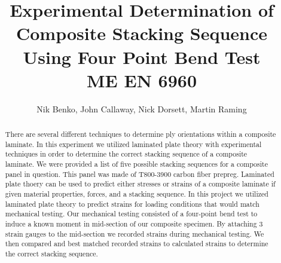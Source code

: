 \documentclass[12pt]{article}
\begin{document}
\title{ Experimental Determination of Composite Stacking Sequence Using Four Point Bend Test\\ \normalsize{ME EN 6960}}
\author{Nik Benko, John Callaway, Nick Dorsett, Martin Raming}
\maketitle
\begin{abstract} %
	There are several different techniques to determine ply orientations within a composite laminate. In this experiment we utilized laminated plate theory with experimental techniques in order to determine the correct stacking sequence of a composite laminate.   We were provided a list of five possible stacking sequences for a composite panel in question. This panel was made of T800-3900 carbon fiber prepreg. Laminated plate thoery can be used to predict either stresses or strains of a composite laminate if given material properties, forces, and a stacking sequence. In this project we utilized laminated plate theory to predict strains for loading conditions that would match mechanical testing.  Our mechanical testing consisted of a four-point bend test to induce a known moment in mid-section of our composite specimen. By attaching 3 strain gauges to the mid-section we recorded strains during mechanical testing. We then compared and best matched recorded strains to calculated strains to determine the correct stacking sequence.  \end{abstract}
\end{document}
